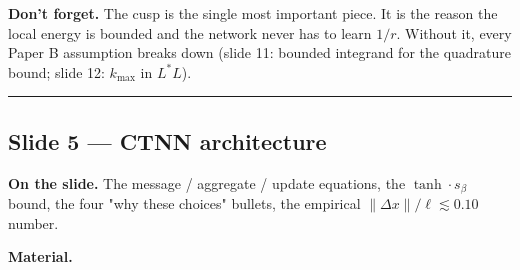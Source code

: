 \documentclass[11pt]{article}
\begin{document}
\textbf{Don't forget.} The cusp is the single most important piece. It is the
reason the local energy is bounded and the network never has to learn
$1/r$. Without it, every Paper B assumption breaks down (slide 11: bounded
integrand for the quadrature bound; slide 12: $k_{\max}$ in $L^*L$).

\vspace{4pt}\hrule\vspace{8pt}

\subsection*{Slide 5 --- CTNN architecture}

\textbf{On the slide.} The message / aggregate / update equations, the
$\tanh\cdot s_\beta$ bound, the four "why these choices" bullets, the
empirical $\|\Delta x\|/\ell \lesssim 0.10$ number.

\textbf{Material.}
\end{document}
